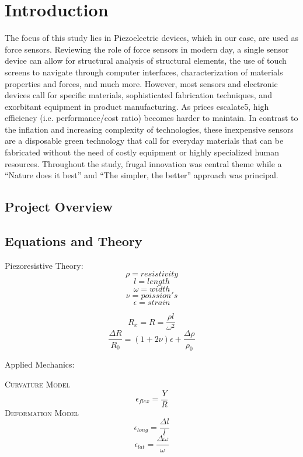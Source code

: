 \documentclass[12pt]{article}
\begin{document}
\section{Introduction}
The focus of this study lies in Piezoelectric devices, which in our case, are used as force sensors. Reviewing the role of force sensors in modern day, a single sensor device can allow for structural analysis of structural elements, the use of touch screens to navigate through computer interfaces, characterization of materials properties and forces, and much more. However, most sensors and electronic devices call for specific materials, sophisticated fabrication techniques, and exorbitant equipment in product manufacturing. As prices escalate5, high efficiency (i.e. performance/cost ratio) becomes harder to maintain. In contrast to the inflation and increasing complexity of technologies, these inexpensive sensors are a disposable green technology that call for everyday materials that can be fabricated without the need of costly equipment or highly specialized human resources. Throughout the study, frugal innovation was central theme while a “Nature does it best” and “The simpler, the better” approach was principal.



\pagebreak



\subsection{Project Overview}

\subsection{Equations and Theory}

Piezoresistive Theory: \\

$$\rho=resistivity$$
$$\textit{l}=length$$
$$\omega=width$$
$$\nu=poission's$$
$$\epsilon=strain$$

$$R_x=R=\frac{\rho\textit{l}}{\omega^{2}}$$
$$\frac{\Delta R}{R_0}=(1+2\nu)\epsilon+\frac{\Delta \rho}{\rho_0}$$


Applied Mechanics: \\
\begin{center}
\textsc{Curvature Model}
$$\epsilon_{flex}=\frac{Y}{R}$$
\textsc{Deformation Model} 
$$\epsilon_{long}=\frac{\Delta\textit{l}}{\textit{l}}$$
$$\epsilon_{lat}=\frac{\Delta\omega}{\omega}$$
\end{center}
\end{document}
